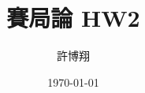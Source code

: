 \setlength{\parindent}{0pt}

\title{賽局論 HW2}
\author{許博翔}
\date{\today}
\maketitle
\thispagestyle{empty}
\setcounter{page}{1}
\pagestyle{fancy}

\renewcommand{\sectionmark}[1]{\markright{#1}}
\renewcommand{\subsectionmark}[1]{}

\lhead{\thetitle}
\chead{}
\rhead{}
\cfoot{}
\rfoot{\thepage}
\renewcommand{\headrulewidth}{0.4pt}
\renewcommand{\footrulewidth}{0.4pt}







\newpage

